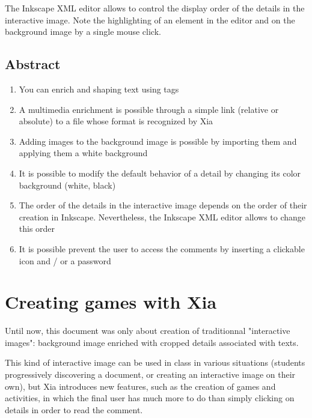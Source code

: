  The Inkscape XML editor allows to control the display order of the details 
in the interactive image. Note the highlighting of an element  
in the editor and on the background image by a single mouse click.

\subsection{Abstract}

\begin{enumerate}
 \item You can enrich and shaping text using tags
 \item A multimedia enrichment is possible through a simple link (relative
or absolute) to a file whose format is recognized by Xia
 \item Adding images to the background image is possible by importing them and applying them a white background
 \item It is possible to modify the default behavior of a detail by changing its color 
background (white, black)
 \item The order of the details in the interactive image depends on the order
of their creation in Inkscape. Nevertheless, the Inkscape XML editor allows to change this order
\item It is possible prevent the user to access the comments by inserting a clickable icon and / or a password
\end{enumerate}

\newpage

\section{Creating games with Xia}\label{games_IA}

Until now, this document was only about creation of traditionnal "interactive images": 
background image enriched with cropped details associated with texts.

This kind of interactive image can be used in class in various situations 
(students progressively discovering a document, or creating an interactive image
on their own), but Xia introduces new features, 
such as the creation of games and activities, in which the final user 
has much more to do than simply clicking on details in order to read the comment.

